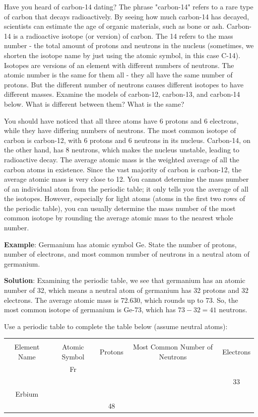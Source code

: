 Have you heard of carbon-14 dating? The phrase "carbon-14" refers to a rare
type of carbon that decays radioactively. By seeing how much carbon-14 has
decayed, scientists can estimate the age of organic materials, such as bone or
ash. Carbon-14 is a radioactive isotope (or version) of carbon. The 14 refers to
the mass number - the total amount of protons and neutrons in the nucleus
(sometimes, we shorten the isotope name by just using the atomic symbol, in
this case C-14). Isotopes are versions of an element with different numbers of
neutrons. The atomic number is the same for them all - they all have the same
number of protons. But the different number of neutrons causes different
isotopes to have different masses. Examine the models of carbon-12, carbon-13,
and carbon-14 below. What is different between them? What is the same?



You should have noticed that all three atoms have 6 protons and 6 electrons,
while they have differing numbers of neutrons. The most common isotope of carbon
is carbon-12, with 6 protons and 6 neutrons in its nucleus. Carbon-14, on the
other hand, has 8 neutrons, which makes the nucleus unstable, leading to
radioactive decay. The average atomic mass
is the weighted average of all the carbon atoms in existence. Since the vast
majority of carbon is carbon-12, the average atomic mass is very close to 12.
You cannot determine the mass number of an individual atom from the periodic
table; it only tells you the average of all the isotopes. However, especially
for light atoms (atoms in the first two rows of the periodic table), you can
usually determine the mass number of the most common isotope by rounding the
average atomic mass to the nearest whole number.

\textbf{Example}: Germanium has atomic symbol Ge. State the number of protons,
number of electrons, and most common number of neutrons in a neutral atom of
germanium.

\textbf{Solution}: Examining the periodic table, we see that germanium has an
atomic number of 32, which means a neutral atom of germanium has 32 protons and
32 electrons. The average atomic mass is 72.630, which rounds up to 73. So, the
most common isotope of germanium is Ge-73, which has $73 - 32 = 41$ neutrons.

\begin{Exercise}[title = {Determining Numbers of Subatomic Particles}, label = pne]
Use a periodic table to complete the table below (assume neutral atoms): %

\begin{tabular}{|c|c|c|c|c|}
\hline\\
Element Name & Atomic Symbol & Protons & Most Common Number of Neutrons & Electrons\\\hline
 & Fr & & & \\\hline
 & & & & 33\\\hline
 Erbium & & & & \\\hline
  & & 48 & & \\\hline
\end{tabular}
\end{Exercise}

